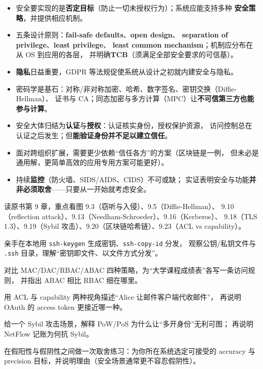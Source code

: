 \begin{closeread}
\end{closeread}



\begin{itemize}
  \item 安全要实现的是\textbf{否定目标}（防止一切未授权行为）；系统应能支持多种
        \textbf{安全策略}，并提供相应机制。
  \item 五条设计原则：\textbf{fail-safe defaults}、\textbf{open design}、
        \textbf{separation of privilege}、\textbf{least privilege}、
        \textbf{least common mechanism}；机制应分布在从 OS 到应用的各层，
        并明确\textbf{TCB}（须满足全部安全要求的可信基）。
  \item \textbf{隐私}日益重要，GDPR 等法规促使系统从设计之初就内建安全与隐私。
  \item 密码学是基石：对称/非对称加密、哈希、数字签名、密钥交换（Diffie-Hellman）、
        证书与 CA；同态加密与多方计算（MPC）让\textbf{不可信第三方也能参与计算}。
  \item 安全大体归结为\textbf{认证}与\textbf{授权}：认证核实身份，授权保护资源，
        访问控制总在认证之后发生；但\textbf{能验证身份并不足以建立信任}。
  \item 面对跨组织扩展，需要更少依赖“信任各方”的方案（区块链是一例，
        但未必是通用解，更简单高效的应用专用方案可能更好）。
  \item 持续\textbf{监控}（防火墙、SIDS/AIDS、CIDS）不可或缺；
        实证表明安全与功能\textbf{并非必须取舍}——只要从一开始就考虑安全。
\end{itemize}

\begin{actions}
  \item 读原书第 9 章，重点看图 9.3（窃听与入侵）、9.5（Diffie-Hellman）、
        9.10（reflection attack）、9.13（Needham-Schroeder）、9.16（Kerberos）、
        9.18（TLS 1.3）、9.19（Sybil 攻击）、9.20（区块链哈希链）、9.23（ACL vs capability）。
  \item 亲手在本地用 \texttt{ssh-keygen} 生成密钥、\texttt{ssh-copy-id} 分发，
        观察公钥/私钥文件与 \texttt{.ssh} 目录，理解“密钥即文件、以文件方式分发”。
  \item 对比 MAC/DAC/RBAC/ABAC 四种策略，为“大学课程成绩表”各写一条访问规则，
        并指出 ABAC 相比 RBAC 细在哪里。
  \item 用 ACL 与 capability 两种视角描述“Alice 让邮件客户端代收邮件”，
        再说明 OAuth 的 access token 更接近哪一种。
  \item 给一个 Sybil 攻击场景，解释 PoW/PoS 为什么让“多开身份”无利可图；
        再说明 NetFlow 记账为何抗 Sybil。
  \item 在假阳性与假阴性之间做一次取舍练习：为你所在系统选定可接受的
        accuracy 与 precision 目标，并说明理由（安全场景通常更不容忍假阴性）。
\end{actions}
